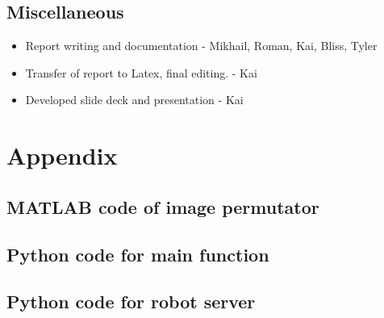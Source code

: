 \documentclass[a4paper,12pt]{article}
\newcommand{\robotServerName}{Python code for robot server}
\begin{document}
\subsection{Miscellaneous}
	\begin{itemize}
		\item Report writing and documentation - Mikhail, Roman, Kai, Bliss, Tyler 
		\item Transfer of report to Latex, final editing. - Kai
		\item Developed slide deck and presentation - Kai	
	\end{itemize}

 
	
	
\section{Appendix}

\subsection{MATLAB code of image permutator}
	

\subsection{Python code for main function}
	

\subsection{\robotServerName}
	
	
\end{document}
